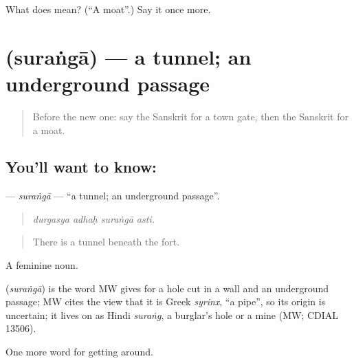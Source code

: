 \begin{tcolorbox}[breakable,colback=teal!4,colframe=teal!35!black,title={Before you move on}]
What does  mean? (\textquotedblleft{}A moat\textquotedblright{}.) Say it once more.
\end{tcolorbox}
\section[\texorpdfstring{\sk{सुरंगा} (suraṅgā)}{सुरंगा (suraṅgā)}]{ (suraṅgā) — a tunnel; an underground passage}

\label{lesson:SA-C422-suranga}



\begin{quote}
Before the new one: say the Sanskrit for a town gate, then the Sanskrit for a moat.
\end{quote}

\subsection*{You'll want to know: }
\textbf{} — \emph{suraṅgā} — \textquotedblleft{}a tunnel; an underground passage\textquotedblright{}.

\begin{quote}
   
\end{quote}

\begin{quote}
\emph{durgasya adhaḥ suraṅgā asti.}
\end{quote}

\begin{quote}
There is a tunnel beneath the fort.
\end{quote}

A feminine noun.

\begin{cousinweb}
\textbf{} (\emph{suraṅgā}) is the word MW gives for a hole cut in a wall and an underground passage; MW cites the view that it is Greek \emph{syrinx}, \textquotedblleft{}a pipe\textquotedblright{}, so its origin is uncertain; it lives on as Hindi \emph{suraṅg}, a burglar's hole or a mine (MW; CDIAL 13506).
\end{cousinweb}

\begin{grammarlens}[title={What you've built}]
One more word for getting around.
\end{grammarlens}

